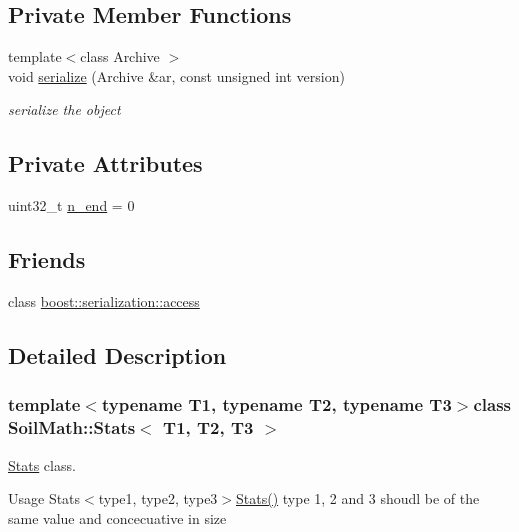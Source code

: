 \subsection*{Private Member Functions}
\begin{DoxyCompactItemize}
\item 
{\footnotesize template$<$class Archive $>$ }\\void \hyperlink{class_soil_math_1_1_stats_a708500880cf0fccd205fb59787f8899f}{serialize} (Archive \&ar, const unsigned int version)
\begin{DoxyCompactList}\small\item\em serialize the object \end{DoxyCompactList}\end{DoxyCompactItemize}
\subsection*{Private Attributes}
\begin{DoxyCompactItemize}
\item 
uint32\+\_\+t \hyperlink{class_soil_math_1_1_stats_a58553c8379f35dbc40f46ad228b5457e}{n\+\_\+end} = 0
\end{DoxyCompactItemize}
\subsection*{Friends}
\begin{DoxyCompactItemize}
\item 
class \hyperlink{class_soil_math_1_1_stats_ac98d07dd8f7b70e16ccb9a01abf56b9c}{boost\+::serialization\+::access}
\end{DoxyCompactItemize}


\subsection{Detailed Description}
\subsubsection*{template$<$typename T1, typename T2, typename T3$>$class Soil\+Math\+::\+Stats$<$ T1, T2, T3 $>$}

\hyperlink{class_soil_math_1_1_stats}{Stats} class. 

Usage Stats$<$type1, type2, type3$>$\hyperlink{class_soil_math_1_1_stats_aa9727b7ea39b46f8a010a7b710b26d83}{Stats()} type 1, 2 and 3 shoudl be of the same value and concecuative in size 

